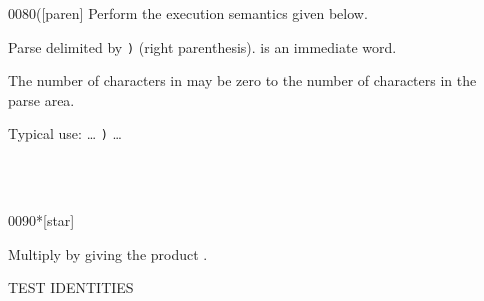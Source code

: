\begin{worddef}[p]{0080}{(}[paren]
\compile
	Perform the execution semantics given below.

\execute

	Parse  delimited by \texttt{)}
	(right parenthesis).
	 is an immediate word.

	The number of characters in  may be zero to the
	number of characters in the parse area.


	\begin{rationale} %
		Typical use: {\ldots}  \texttt{)} {\ldots}
	\end{rationale}

	\begin{testing} %
		 \\[\parskip]
		 \\
	\end{testing}
\end{worddef}


\begin{worddef}{0090}{*}[star]
\item {}

	Multiply  by  giving the product
	.

	\begin{testing} %
		 \tab[4]  TEST IDENTITIE{\bs}S \\
		 \\
		 \\
		 \\
		 \\
		 \\
		 \\
		 \\

		 \\
		 \\
		 \\
	\end{testing}
\end{worddef}


